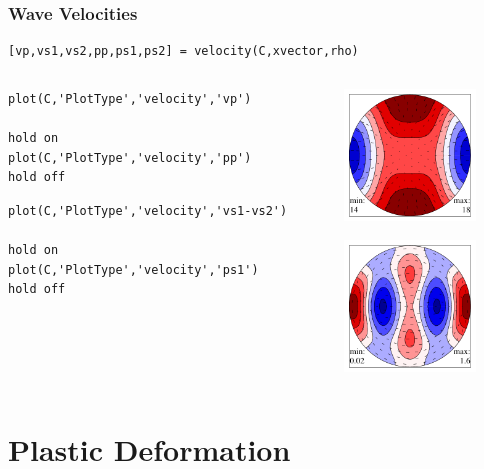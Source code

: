 \documentclass[compress]{beamer}
\begin{document}
\begin{frame}[fragile]
  \frametitle{Wave Velocities}

\begin{lstlisting}[style=input]
[vp,vs1,vs2,pp,ps1,ps2] = velocity(C,xvector,rho)
\end{lstlisting}

  \begin{columns}
  \begin{column}{8.5cm}

\begin{lstlisting}[style=input]
plot(C,'PlotType','velocity','vp')

hold on
plot(C,'PlotType','velocity','pp')
hold off
\end{lstlisting}

\bigskip
\pause

    \begin{lstlisting}[style=input]
plot(C,'PlotType','velocity','vs1-vs2')

hold on
plot(C,'PlotType','velocity','ps1')
hold off
\end{lstlisting}

  \end{column}
    \begin{column}{3.5cm}
      \includegraphics[width=3.5cm]{pic/vp-pp}

      \includegraphics[width=3.5cm]{pic/vs12-ps1}
  \end{column}

  \end{columns}

\end{frame}

\section{Plastic Deformation}
\label{sec:plastic-deformation}
\end{document}
